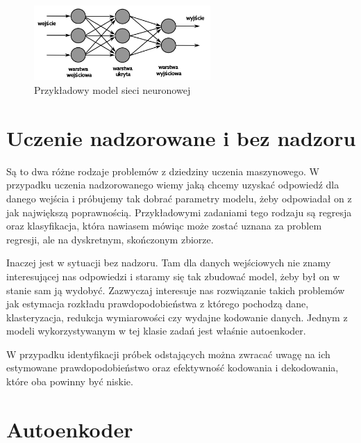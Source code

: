 \begin{figure}[h!]
    \centering
    \includegraphics[width=0.6\textwidth]{images/neural_nets}
    \caption{Przykładowy model sieci neuronowej}
    \label{fig:neural_nets}
\end{figure}

\section{Uczenie nadzorowane i bez nadzoru}

Są to dwa różne rodzaje problemów z dziedziny uczenia maszynowego. W przypadku uczenia nadzorowanego wiemy jaką chcemy uzyskać odpowiedź dla danego wejścia i próbujemy tak dobrać parametry modelu, żeby odpowiadał on z jak największą poprawnością. Przykładowymi zadaniami tego rodzaju są regresja oraz klasyfikacja, która nawiasem mówiąc może zostać uznana za problem regresji, ale na dyskretnym, skończonym zbiorze.

Inaczej jest w sytuacji bez nadzoru. Tam dla danych wejściowych nie znamy interesującej nas odpowiedzi i staramy się tak zbudować model, żeby był on w stanie sam ją wydobyć. Zazwyczaj interesuje nas rozwiązanie takich problemów jak estymacja rozkładu prawdopodobieństwa z którego pochodzą dane, klasteryzacja, redukcja wymiarowości czy wydajne kodowanie danych. Jednym z modeli wykorzystywanym w tej klasie zadań jest właśnie autoenkoder.

W przypadku identyfikacji próbek odstających można zwracać uwagę na ich estymowane prawdopodobieństwo oraz efektywność kodowania i dekodowania, które oba powinny być niskie.

\section{Autoenkoder}

